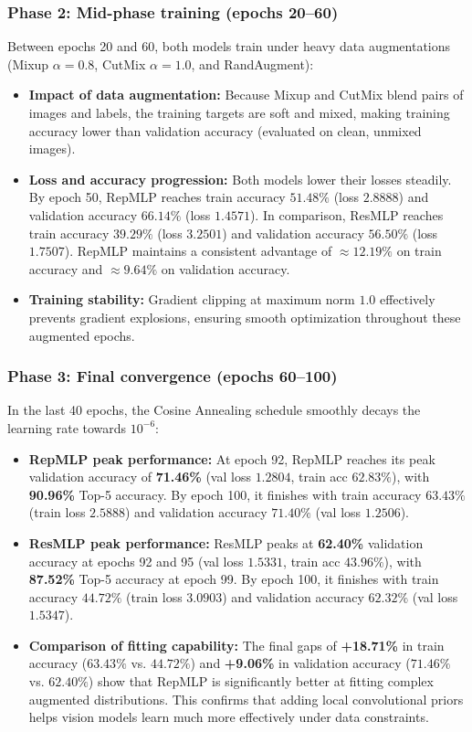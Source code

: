 \subsubsection{Phase 2: Mid-phase training (epochs 20--60)}
Between epochs 20 and 60, both models train under heavy data augmentations (Mixup $\alpha=0.8$, CutMix $\alpha=1.0$, and RandAugment):
\begin{itemize}[leftmargin=1.5em]
    \item \textbf{Impact of data augmentation:} Because Mixup and CutMix blend pairs of images and labels, the training targets are soft and mixed, making training accuracy lower than validation accuracy (evaluated on clean, unmixed images).
    \item \textbf{Loss and accuracy progression:} Both models lower their losses steadily. By epoch 50, RepMLP reaches train accuracy $51.48\%$ (loss $2.8888$) and validation accuracy $66.14\%$ (loss $1.4571$). In comparison, ResMLP reaches train accuracy $39.29\%$ (loss $3.2501$) and validation accuracy $56.50\%$ (loss $1.7507$). RepMLP maintains a consistent advantage of $\approx 12.19\%$ on train accuracy and $\approx 9.64\%$ on validation accuracy.
    \item \textbf{Training stability:} Gradient clipping at maximum norm $1.0$ effectively prevents gradient explosions, ensuring smooth optimization throughout these augmented epochs.
\end{itemize}

\subsubsection{Phase 3: Final convergence (epochs 60--100)}
In the last 40 epochs, the Cosine Annealing schedule smoothly decays the learning rate towards $10^{-6}$:
\begin{itemize}[leftmargin=1.5em]
    \item \textbf{RepMLP peak performance:} At epoch 92, RepMLP reaches its peak validation accuracy of \textbf{71.46\%} (val loss $1.2804$, train acc $62.83\%$), with \textbf{90.96\%} Top-5 accuracy. By epoch 100, it finishes with train accuracy $63.43\%$ (train loss $2.5888$) and validation accuracy $71.40\%$ (val loss $1.2506$).
    \item \textbf{ResMLP peak performance:} ResMLP peaks at \textbf{62.40\%} validation accuracy at epochs 92 and 95 (val loss $1.5331$, train acc $43.96\%$), with \textbf{87.52\%} Top-5 accuracy at epoch 99. By epoch 100, it finishes with train accuracy $44.72\%$ (train loss $3.0903$) and validation accuracy $62.32\%$ (val loss $1.5347$).
    \item \textbf{Comparison of fitting capability:} The final gaps of \textbf{+18.71\%} in train accuracy ($63.43\%$ vs. $44.72\%$) and \textbf{+9.06\%} in validation accuracy ($71.46\%$ vs. $62.40\%$) show that RepMLP is significantly better at fitting complex augmented distributions. This confirms that adding local convolutional priors helps vision models learn much more effectively under data constraints.
\end{itemize}

